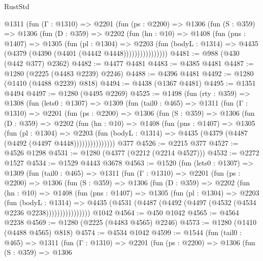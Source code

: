 \begin{lexlean}{RustStd}
\begin{coremodule}
          @1311
            (fun (Γ : @1310) =>
            @2201
              (fun (ps : @2200) =>
              @1306
                (fun (S : @359) =>
                @1306
                  (fun (D : @359) =>
                  @2202
                    (fun (hn : @10) =>
                    @1408
                      (fun (pns : @1407) =>
                      @1305
                        (fun (pl : @1304) =>
                        @2203
                          (fun (bodyL : @1314) =>
                          @4435 (@4379 (@4390 (@4401 (@4442 @4448))))))))))))))))
@4481 := @988 (@430 (@442 @377) @2362)
@4482 := @4477 @4481
@4483 := @4385 @4481
@4487 := @1280 (@2225 (@4483 @2239) @2246)
@4488 := @4396 @4481
@4492 := @1280 (@1410 (@4488 @2239) @818)
@4494 := @4438 (@1367 @4481)
@4495 := @1351 @4494
@4497 := @1280 (@4495 @2269)
@4525 := @1498
    (fun (rty : @359) =>
    @1308
      (fun (lets0 : @1307) =>
      @1309
        (fun (tail0 : @465) =>
        @1311
          (fun (Γ : @1310) =>
          @2201
            (fun (ps : @2200) =>
            @1306
              (fun (S : @359) =>
              @1306
                (fun (D : @359) =>
                @2202
                  (fun (hn : @10) =>
                  @1408
                    (fun (pns : @1407) =>
                    @1305
                      (fun (pl : @1304) =>
                      @2203
                        (fun (bodyL : @1314) =>
                        @4435 (@4379 (@4487 (@4492 (@4497 @4448)))))))))))))))
    @377
@4526 := @2215 @377
@4527 := @4526 @1298
@4531 := @1280 (@4377 (@2212 (@2214 @4527)))
@4532 := @2272 @1527
@4534 := @1529 @4443 @3678
@4563 := @1520
    (fun (lets0 : @1307) =>
    @1309
      (fun (tail0 : @465) =>
      @1311
        (fun (Γ : @1310) =>
        @2201
          (fun (ps : @2200) =>
          @1306
            (fun (S : @359) =>
            @1306
              (fun (D : @359) =>
              @2202
                (fun (hn : @10) =>
                @1408
                  (fun (pns : @1407) =>
                  @1305
                    (fun (pl : @1304) =>
                    @2203
                      (fun (bodyL : @1314) =>
                      @4435 (@4531 (@4487 (@4492 (@4497 (@4532 (@4534 @2236 @2238))))))))))))))))
    @1042
@4564 := @450 @1042
@4565 := @4564 @2238
@4569 := @1280 (@2225 (@4483 @4565) @2246)
@4573 := @1280 (@1410 (@4488 @4565) @818)
@4574 := @4534 @1042
@4599 := @1544
    (fun (tail0 : @465) =>
    @1311
      (fun (Γ : @1310) =>
      @2201
        (fun (ps : @2200) =>
        @1306
          (fun (S : @359) =>
          @1306

\end{coremodule}
\end{lexlean}
